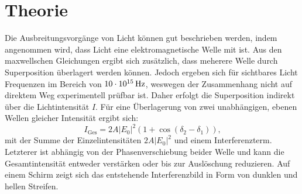 
\section{Theorie}
\label{sec:Theorie}
Die Ausbreitungsvorgänge von Licht können gut beschrieben werden, indem angenommen
wird, dass Licht eine elektromagnetische Welle mit ist. Aus den maxwellschen Gleichungen
ergibt sich zusätzlich, dass meherere Welle durch Superposition überlagert werden können.
Jedoch ergeben sich für sichtbares Licht Frequenzen im Bereich von $\SI{10 E15}{\hertz}$,
weswegen der Zusammenhang nicht auf direktem Weg experimentell prüfbar ist. Daher
erfolgt die Superposition indirekt über die Lichtintensität $I$. Für eine Überlagerung von zwei unabhängigen, ebenen Wellen gleicher Intensität ergibt sich:
\begin{equation}
  I_\text{Ges} = 2 A | E_0 |^2 \left(1 + \cos(\delta_2 - \delta_1) \right)\text{,}
\end{equation}
mit der Summe der Einzelintensitäten $2 A | E_0 |^2$ und einem Interferenzterm. Letzterer
ist abhängig von der Phasenverschiebung beider Welle und kann die Gesamtintensität entweder verstärken oder bis zur Auslöschung reduzieren.
Auf einem Schirm zeigt sich das entstehende Interferenzbild in Form von dunklen und hellen Streifen.

